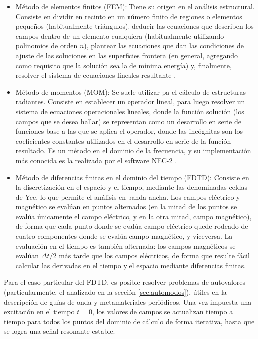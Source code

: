 \begin{itemize}
	\item Método de elementos finitos (FEM): Tiene su origen en el análisis estructural. Consiste en dividir en recinto en un número finito de regiones o elementos pequeños (habitualmente triángulos), deducir las ecuaciones que describen los campos dentro de un elemento cualquiera (habitualmente utilizando polinomios de orden $n$), plantear las ecuaciones que dan las condiciones de ajuste de las soluciones en las superficies frontera (en general, agregando como requisito que la solución sea la de mínima energía) y, finalmente, resolver el sistema de ecuaciones lineales resultante \cite{Fernandez:Electromag}.
	\item Método de momentos (MOM): Se suele utilizar pa el cálculo de estructuras radiantes. Consiste en establecer un operador lineal, para luego resolver un sistema de ecuaciones operacionales lineales, donde la función solución (los campos que se desea hallar) se representan como un desarrollo en serie de funciones base a las que se aplica el operador, donde las incógnitas son los coeficientes constantes utilizados en el desarrollo en serie de la función resultado. Es un método en el dominio de la frecuencia, y su implementación más conocida es la realizada por el software NEC-2 \cite{Fernandez:Electromag}.
	\item Método de diferencias finitas en el dominio del tiempo (FDTD): Consiste en la discretización en el espacio y el tiempo, mediante las denominadas celdas de Yee, lo que permite el análisis en banda ancha. Los campos eléctrico y magnético se evalúan en puntos alternados (en la mitad de los puntos se evalúa únicamente el campo eléctrico, y en la otra mitad, campo magnético), de forma que cada punto donde se evalúa campo eléctrico quede rodeado de cuatro componentes donde se evalúa campo magnético, y viceversa. La evaluación en el tiempo es también alternada: los campos magnéticos se evalúan $\Delta t/2$ más tarde que los campos eléctricos, de forma que resulte fácil calcular las derivadas en el tiempo y el espacio mediante diferencias finitas.
\end{itemize}

Para el caso particular del FDTD, es posible resolver problemas de autovalores (particularmente, el analizado en la sección \ref{sec:automodos}), útiles en la descripción de guías de onda y metamateriales periódicos. Una vez impuesta una excitación en el tiempo $t=0$, los valores de campos se actualizan tiempo a tiempo para todos los puntos del dominio de cálculo de forma iterativa, hasta que se logra una señal resonante estable.

